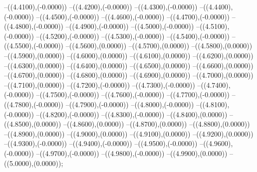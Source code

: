 {	--({\sx*(4.4100)},{\sy*(-0.0000)})
	--({\sx*(4.4200)},{\sy*(-0.0000)})
	--({\sx*(4.4300)},{\sy*(-0.0000)})
	--({\sx*(4.4400)},{\sy*(-0.0000)})
	--({\sx*(4.4500)},{\sy*(-0.0000)})
	--({\sx*(4.4600)},{\sy*(-0.0000)})
	--({\sx*(4.4700)},{\sy*(-0.0000)})
	--({\sx*(4.4800)},{\sy*(-0.0000)})
	--({\sx*(4.4900)},{\sy*(-0.0000)})
	--({\sx*(4.5000)},{\sy*(-0.0000)})
	--({\sx*(4.5100)},{\sy*(-0.0000)})
	--({\sx*(4.5200)},{\sy*(-0.0000)})
	--({\sx*(4.5300)},{\sy*(-0.0000)})
	--({\sx*(4.5400)},{\sy*(-0.0000)})
	--({\sx*(4.5500)},{\sy*(-0.0000)})
	--({\sx*(4.5600)},{\sy*(0.0000)})
	--({\sx*(4.5700)},{\sy*(0.0000)})
	--({\sx*(4.5800)},{\sy*(0.0000)})
	--({\sx*(4.5900)},{\sy*(0.0000)})
	--({\sx*(4.6000)},{\sy*(0.0000)})
	--({\sx*(4.6100)},{\sy*(0.0000)})
	--({\sx*(4.6200)},{\sy*(0.0000)})
	--({\sx*(4.6300)},{\sy*(0.0000)})
	--({\sx*(4.6400)},{\sy*(0.0000)})
	--({\sx*(4.6500)},{\sy*(0.0000)})
	--({\sx*(4.6600)},{\sy*(0.0000)})
	--({\sx*(4.6700)},{\sy*(0.0000)})
	--({\sx*(4.6800)},{\sy*(0.0000)})
	--({\sx*(4.6900)},{\sy*(0.0000)})
	--({\sx*(4.7000)},{\sy*(0.0000)})
	--({\sx*(4.7100)},{\sy*(0.0000)})
	--({\sx*(4.7200)},{\sy*(-0.0000)})
	--({\sx*(4.7300)},{\sy*(-0.0000)})
	--({\sx*(4.7400)},{\sy*(-0.0000)})
	--({\sx*(4.7500)},{\sy*(-0.0000)})
	--({\sx*(4.7600)},{\sy*(-0.0000)})
	--({\sx*(4.7700)},{\sy*(-0.0000)})
	--({\sx*(4.7800)},{\sy*(-0.0000)})
	--({\sx*(4.7900)},{\sy*(-0.0000)})
	--({\sx*(4.8000)},{\sy*(-0.0000)})
	--({\sx*(4.8100)},{\sy*(-0.0000)})
	--({\sx*(4.8200)},{\sy*(-0.0000)})
	--({\sx*(4.8300)},{\sy*(-0.0000)})
	--({\sx*(4.8400)},{\sy*(0.0000)})
	--({\sx*(4.8500)},{\sy*(0.0000)})
	--({\sx*(4.8600)},{\sy*(0.0000)})
	--({\sx*(4.8700)},{\sy*(0.0000)})
	--({\sx*(4.8800)},{\sy*(0.0000)})
	--({\sx*(4.8900)},{\sy*(0.0000)})
	--({\sx*(4.9000)},{\sy*(0.0000)})
	--({\sx*(4.9100)},{\sy*(0.0000)})
	--({\sx*(4.9200)},{\sy*(0.0000)})
	--({\sx*(4.9300)},{\sy*(-0.0000)})
	--({\sx*(4.9400)},{\sy*(-0.0000)})
	--({\sx*(4.9500)},{\sy*(-0.0000)})
	--({\sx*(4.9600)},{\sy*(-0.0000)})
	--({\sx*(4.9700)},{\sy*(-0.0000)})
	--({\sx*(4.9800)},{\sy*(-0.0000)})
	--({\sx*(4.9900)},{\sy*(0.0000)})
	--({\sx*(5.0000)},{\sy*(0.0000)});
}
